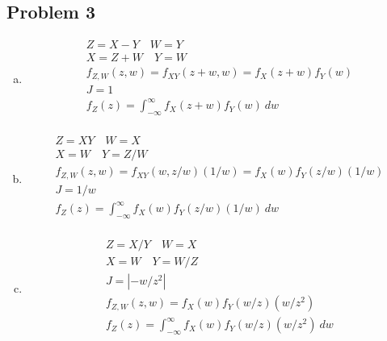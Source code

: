 \documentclass{article}
\begin{document}
\begin{flushleft}
\section*{Problem 3}
\begin{enumerate}[(a)]
\item 
\begin{multline*}
Z=X-Y \quad W=Y\\
X=Z+W \quad Y=W\\
f_{Z,W}(z,w)=f_{XY}(z+w,w)=f_X(z+w)f_Y(w)\\
J=1\\
f_Z(z)=\int_{-\infty}^{\infty}f_X(z+w)f_Y(w)\ dw\\
\end{multline*}
\item
\begin{multline*}
Z=XY \quad W=X\\
X=W \quad Y=Z/W\\
f_{Z,W}(z,w)=f_{XY}(w,z/w)(1/w)=f_X(w)f_Y(z/w)(1/w)\\
J=1/w\\
f_Z(z)=\int_{-\infty}^{\infty}f_X(w)f_Y(z/w)(1/w)\ dw\\
\end{multline*}
\item
\begin{multline*}
Z=X/Y \quad W=X\\
X=W \quad Y=W/Z\\
J=|-w/z^2|\\
f_{Z,W}(z,w)=f_X(w)f_Y(w/z)(w/z^2)\\
f_Z(z)=\int_{-\infty}^{\infty}f_X(w)f_Y(w/z)(w/z^2)\ dw\\
\end{multline*}
\end{enumerate}

\end{flushleft}
\end{document}
